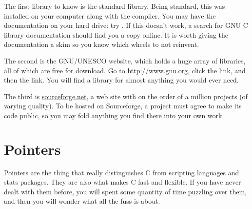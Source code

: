 The first library to know is the standard library. Being standard, this was
installed on your computer along with the compiler. You may have the
documentation on your hard drive: try . If this doesn't
work, a search for GNU C library documentation should find you a copy
online. It is worth giving the documentation a skim so you know which
wheels to not reinvent.

The second is the GNU/UNESCO website, which holds a huge
array of libraries, all of which are free for download. Go to
\url{http://www.gnu.org}, click the  link, and then
the  link. You will find a library for almost
anything you would ever need.

The third is \url{sourceforge.net}, a web site with on the order of a
million projects (of varying quality). To be hosted on Sourceforge,
a project must agree to make its code public, so you may fold anything
you find there into your own work.


 \label{prepointers}\section{Pointers} \label{pointers} 

Pointers are the thing that really distinguishes C from scripting
languages and stats packages. They are also what makes C fast and
flexible. If you have never dealt with them before, you will spent some
quantity of time puzzling over them, and then you will wonder what all the
fuss is about. 

